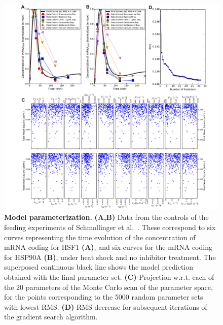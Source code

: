\documentclass[oneside, 10pt, a4paper, twocolumn]{article}
\begin{document}
\begin{figure}
\centering
\includegraphics[width=\textwidth]{Figure2_Paper.pdf}
\caption{\small{\textbf{Model parameterization.} \textbf{(A,B)} Data from the controls of the feeding
experiments of Schmollinger et al.~\cite{Schmollinger2013}. These correspond to six curves
representing the time evolution of the concentration of mRNA coding
for HSF1 \textbf{(A)}, and six curves for the mRNA coding for HSP90A \textbf{(B)}, under heat
shock and no inhibitor treatment. The superposed continuous black line shows the model prediction obtained with the final parameter set. \textbf{(C)} Projection w.r.t. each of the 20 parameters of the Monte Carlo scan of the parameter space, for the points corresponding to the 5000 random parameter sets with lowest RMS. \textbf{(D)}} RMS decrease for subsequent iterations of the gradient search algorithm.}
\label{Figure2label}
\end{figure}

\clearpage
\end{document}

